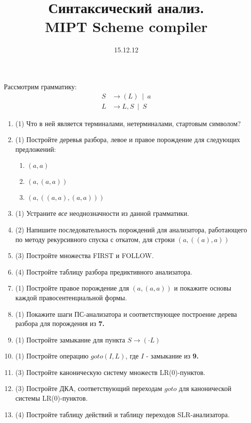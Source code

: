 \documentclass[a4,12pt]{article}
\begin{document}
\title{Синтаксический анализ. \\
      {\small  MIPT Scheme compiler }}
\date{15.12.12}

\maketitle

\thispagestyle{empty}

Рассмотрим грамматику:
\begin{align*}
  S &\rightarrow (L) \: \mid \: a \\
  L &\rightarrow L,S \: \mid \: S
\end{align*}

\begin{enumerate}
  \item (1) Что в ней является терминалами, нетерминалами, стартовым символом?
  \item (1) Постройте деревья разбора, левое и правое порождение для следующих предложений:
    \begin{enumerate}
      \item $(a,a)$
      \item $(a,(a,a))$
      \item $(a,((a,a),(a,a)))$
    \end{enumerate}
  \item (1) Устраните \textit{все} неоднозначности из данной грамматики.
  \item (2) Напишите последовательность порождений для анализатора, работающего по методу рекурсивного спуска с откатом, для строки $(a,((a),a))$
  \item (3) Постройте множества FIRST и FOLLOW.
  \item (4) Постройте таблицу разбора предиктивного анализатора.
  \item (1) Постройте правое порождение для $(a,(a,a))$ и покажите основы каждой правосентенциальной формы.
  \item (1) Покажите шаги ПС-анализатора и соответствующее построение дерева разбора для порождения из \textbf{7.}
  \item (1) Постройте замыкание для пункта $S \rightarrow (\cdot L)$
  \item (1) Постройте операцию $goto(I,L)$, где $I$ - замыкание из \textbf{9.}
  \item (3) Постройте каноническую систему множеств LR(0)-пунктов.
  \item (3) Постройте ДКА, соответствующий переходам $goto$ для канонической системы LR(0)-пунктов.
  \item (4) Постройте таблицу действий и таблицу переходов SLR-анализатора.
\end{enumerate}
\end{document}
